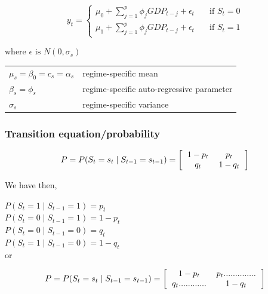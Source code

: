 \documentclass[12pt,a4paper,oneside]{book}
\begin{document}
\begin{equation}
y_{t} =   
  \begin{cases}
    \mu_{0} + \sum^p_{j = 1} \phi_j GDP_{t-j} + \epsilon_t      & \quad \text{if } S_t = 0 \\
    \mu_{1} + \sum^p_{j = 1} \phi_j GDP_{t-j} + \epsilon_t      & \quad \text{if } S_t = 1
  \end{cases}
\end{equation}

where $\epsilon \text{ is } N(0,\sigma_s)$


\begin{tabular}{l l}
    $\mu_{s} = \beta_0 = c_s = \alpha_s $    & regime-specific mean    \\
    $\beta_{s} = \phi_s$ & regime-specific  auto-regressive parameter \\
    $\sigma_{s}$ & regime-specific variance    \\

\end{tabular}

\subsubsection{Transition equation/probability}

\begin{equation}
    P = P(S_t = s_t \mid S_{t-1} = s_{t-1}) = 
\left[ \begin{tabular}{c c}
            $1 - p_{t}$	& $p_{t}$ \\ 
            $q_{t}$	& $1 - q_{t}$ \\ 
\end{tabular} \right]
\end{equation}

We have then,

$P(S_t = 1 \mid S_{t-1} = 1) = p_t$   \\ 
$P(S_t = 0 \mid S_{t-1} = 1) = 1 - p_t$ \\
$P(S_t = 0 \mid S_{t-1} = 0) = q_t$   \\
$P(S_t = 1 \mid S_{t-1} = 0) = 1- q_t$ \\

or 

\begin{equation}
    P = P(S_t = s_t \mid S_{t-1} = s_{t-1}) = 
\left[ \begin{tabular}{c c}
            $1 - p_{t}$	& $p_{t} ..............$ \\ 
            $q_{t} ............$	& $1 - q_{t}$ \\ 
\end{tabular} \right]
\end{equation}
\end{document}

